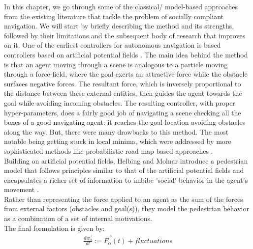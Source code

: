 In this chapter, we go through some of the classical/ model-based approaches from the existing literature that tackle the problem of socially compliant navigation. We will start by briefly describing the method and its strengths, followed by their limitations and the subsequent body of research that improves on it.
One of the earliest controllers for autonomous navigation is based controllers based on artificial potential fields \cite{khatib_1986}. The main idea behind the method is that an agent moving through a scene is analogous to a particle moving through a force-field, where the goal exerts an attractive force while the obstacle surfaces negative forces. The resultant force, which is inversely proportional to the distance between these external entities, then guides the agent towards the goal while avoiding incoming obstacles. The resulting controller, with proper hyper-parameters, does a fairly good job of navigating a scene checking all the boxes of a good navigating agent: it reaches the goal location avoiding obstacles along the way. But, there were many drawbacks to this method. The most notable being getting stuck in local minima, which were addressed by more sophisticated methods like probabilistic road-map based approaches \cite{Lavalle98rrt}. \\

Building on artificial potential fields, Helbing and Molnar introduce a pedestrian model that follows principles similar to that of the artificial potential fields and encapsulates a richer set of information to imbibe 'social' behavior in the agent's movement \cite{helbing_social_1998}.\\

Rather than representing the force applied to an agent as the sum of the forces from external factors (obstacles and goal(s)), they model the pedestrian behavior as a combination of a set of internal motivations.\\

The final formulation is given by:
\begin{align}
\frac{d\vec{w_{\alpha}}}{dt}:=\vec{F_{\alpha}}(t)+fluctuations
\end{align}

